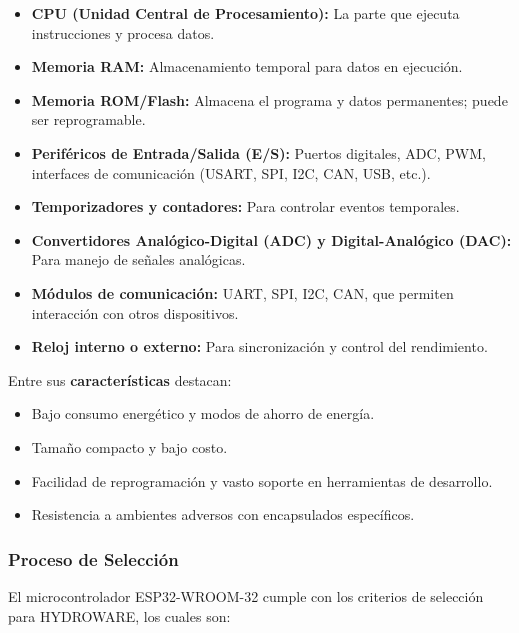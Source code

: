 \documentclass[a4paper,12pt]{article}
\begin{document}
	\begin{itemize}
		\item \textbf{CPU (Unidad Central de Procesamiento):} La parte que ejecuta instrucciones y procesa datos.
		\item \textbf{Memoria RAM:} Almacenamiento temporal para datos en ejecución.
		\item \textbf{Memoria ROM/Flash:} Almacena el programa y datos permanentes; puede ser reprogramable.
		\item \textbf{Periféricos de Entrada/Salida (E/S):} Puertos digitales, ADC, PWM, interfaces de comunicación (USART, SPI, I2C, CAN, USB, etc.).
		\item \textbf{Temporizadores y contadores:} Para controlar eventos temporales.
		\item \textbf{Convertidores Analógico-Digital (ADC) y Digital-Analógico (DAC):} Para manejo de señales analógicas.
		\item \textbf{Módulos de comunicación:} UART, SPI, I2C, CAN, que permiten interacción con otros dispositivos.
		\item \textbf{Reloj interno o externo:} Para sincronización y control del rendimiento.
	\end{itemize}
	
	Entre sus \textbf{características} destacan:
	
	\begin{itemize}
		\item Bajo consumo energético y modos de ahorro de energía.
		\item Tamaño compacto y bajo costo.
		\item Facilidad de reprogramación y vasto soporte en herramientas de desarrollo.
		\item Resistencia a ambientes adversos con encapsulados específicos.
	\end{itemize}
	
	\subsubsection{Proceso de Selección}
	
	El microcontrolador ESP32-WROOM-32 cumple con los criterios de selección para HYDROWARE, los cuales son:
	
\end{document}
